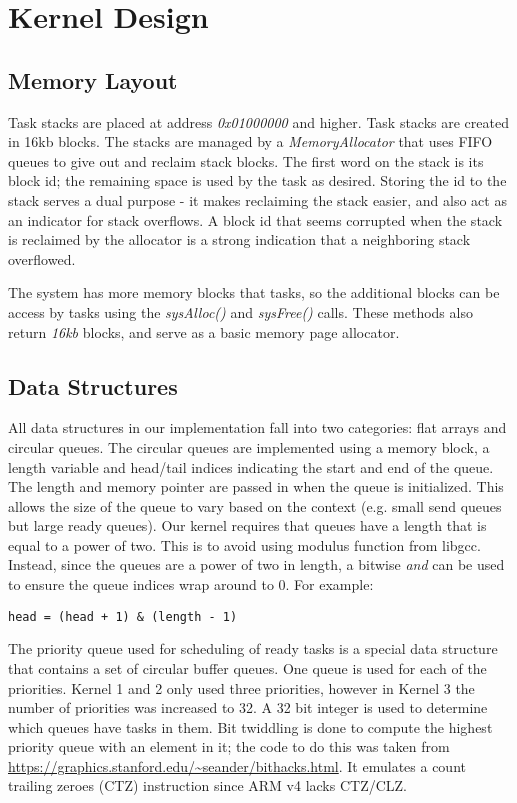 \documentclass[twoside,a4paper]{refart}
\begin{document}
\section{Kernel Design}

\subsection{Memory Layout}
Task stacks are placed at address \textit{0x01000000} and higher. Task stacks are created in 16kb blocks. The stacks are managed by a \textit{MemoryAllocator} that uses FIFO queues to give out and reclaim stack blocks. The first word on the stack is its block id; the remaining space is used by the task as desired. Storing the id to the stack serves a dual purpose - it makes reclaiming the stack easier, and also act as an indicator for stack overflows. A block id that seems corrupted when the stack is reclaimed by the allocator is a strong indication that a neighboring stack overflowed. 

The system has more memory blocks that tasks, so the additional blocks can be access by tasks using the \textit{sysAlloc()} and \textit{sysFree()} calls. These methods also return \textit{16kb} blocks, and serve as a basic memory page allocator.

\subsection{Data Structures}
All data structures in our implementation fall into two categories: flat arrays and circular queues. The circular queues are implemented using a memory block, a length variable and head/tail indices indicating the start and end of the queue. The length and memory pointer are passed in when the queue is initialized. This allows the size of the queue to vary based on the context (e.g. small send queues but large ready queues). Our kernel requires that queues have a length that is equal to a power of two. This is to avoid using modulus function from libgcc. Instead, since the queues are a power of two in length, a bitwise \textit{and} can be used to ensure the queue indices wrap around to 0. For example:

\begin{verbatim}
head = (head + 1) & (length - 1)
\end{verbatim}

The priority queue used for scheduling of ready tasks is a special data structure that contains a set of circular buffer queues. One queue is used for each of the priorities. Kernel 1 and 2 only used three priorities, however in Kernel 3 the number of priorities was increased to 32. A 32 bit integer is used to determine which queues have tasks in them. Bit twiddling is done to compute the highest priority queue with an element in it; the code to do this was taken from \url{https://graphics.stanford.edu/~seander/bithacks.html}. It emulates a count trailing zeroes (CTZ) instruction since ARM v4 lacks CTZ/CLZ.
\end{document}
